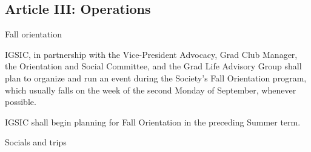 \subsection{Article III: Operations}
\begin{longenum}[ label*=\thesubsection.\arabic*., align=left] 
\item Fall orientation
	\begin{longenum}[ label*=\arabic*., align=left]
	\item IGSIC, in partnership with the Vice-President Advocacy, Grad Club Manager, the Orientation and Social Committee, and the Grad Life Advisory Group shall plan to organize and run an event during the Society’s Fall Orientation program, which usually falls on the week of the second Monday of September, whenever possible.
	\item IGSIC shall begin planning for Fall Orientation in the preceding Summer term.
	\end{longenum}
\item Socials and trips
	\begin{longenum}[ label*=\arabic*., align=left]

\end{longenum}
\end{longenum}
